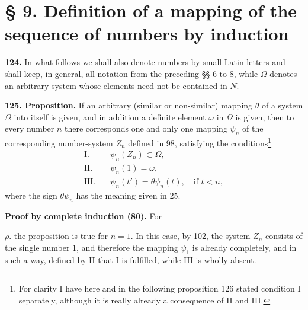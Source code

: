 \documentclass[11pt]{article}
\newcommand{\partof}{\mathrel{\subset}}
\begin{document}
\section*{§ 9. Definition of a mapping of the sequence of numbers by induction}

\noindent\textbf{124.} In what follows we shall also denote numbers by small Latin letters and shall keep, in general, all notation from the preceding §§ 6 to 8, while $\Omega$ denotes an arbitrary system whose elements need not be contained in $N$.

\noindent\textbf{125. Proposition.} If an arbitrary (similar or non-similar) mapping $\theta$ of a system $\Omega$ into itself is given, and in addition a definite element $\omega$ in $\Omega$ is given, then to every number $n$ there corresponds one and only one mapping $\psi_n$ of the corresponding number-system $Z_n$ defined in 98, satisfying the conditions\footnote{For clarity I have here and in the following proposition 126 stated condition I separately, although it is really already a consequence of II and III.}
\begin{align*}
\text{I.}\quad& \psi_n(Z_n)\partof\Omega,\\
\text{II.}\quad& \psi_n(1)=\omega,\\
\text{III.}\quad& \psi_n(t')=\theta\psi_n(t),\quad \text{if }t<n,
\end{align*}
where the sign $\theta\psi_n$ has the meaning given in 25.

\noindent\textbf{Proof by complete induction (80).} For

\noindent $\rho.$ the proposition is true for $n=1$. In this case, by 102, the system $Z_n$ consists of the single number $1$, and therefore the mapping $\psi_1$ is already completely, and in such a way, defined by II that I is fulfilled, while III is wholly absent.
\end{document}
